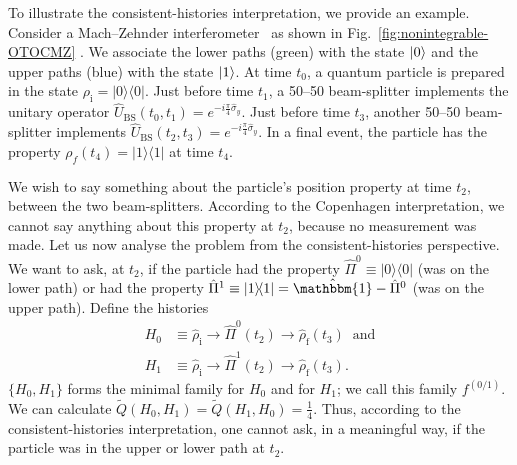 \documentclass[%
 reprint,
superscriptaddress,
nofootinbib,
bibnotes,
 amsmath,amssymb,
 aps,
]{revtex4-1}
\theoremstyle{plain}
\newcommand*{\ketbra}[2]{\lvert #1 \rangle\!\langle #2 \rvert}
\begin{document}
To illustrate the consistent-histories interpretation, we provide an example. Consider a Mach--Zehnder interferometer~\cite{Zehnder91, Mach92} as shown in Fig.~\ref{fig:nonintegrable-OTOCMZ} . We associate the lower paths (green) with the state $\ket{0}$ and the upper paths (blue) with the state $\ket{1}$.  At time $t_0$, a quantum particle is prepared in the state  $\rho_{\mathrm{i}} = \ketbra{0}{0}$. Just before time $t_1$, a 50--50  beam-splitter implements the unitary operator $\hat{U}_{\mathrm{BS}}(t_0, t_1) =e^{ - i \frac{\pi}{4} \hat{\sigma}_y  }$.   Just before time $t_3$, another 50--50  beam-splitter implements $\hat{U}_{\mathrm{BS}}(t_2, t_3)=e^{ - i \frac{\pi}{4} \hat{\sigma}_y  } $.  
In a final event, the particle has
the property  $\rho_f(t_4) = \ketbra{1}{1}$ at time $t_4$.  

We wish to say something about the particle's position property at time $t_2$, between the two beam-splitters.  According to the Copenhagen interpretation, we cannot say anything about this
property at $t_2$, because no measurement was made.  
Let us now analyse the problem from the consistent-histories perspective.  
We want to ask, at $t_2$, if the particle had the property $\hat{\Pi}^0 \equiv \ketbra{0}{0}$ (was on the lower path) or had the property $\hat{\Pi}^1 \equiv \ketbra{1}{1} = \hat{\mathbbm{1}} -\hat{\Pi}^0 $ (was on the upper path). Define the histories
\begin{align}
H_0 &
\equiv
\hat{\rho}_{\mathrm{i}} \rightarrow  \hat{\Pi}^0 (t_2)  \rightarrow \hat{\rho}_{\mathrm{f}} (t_3)  \; \; \mathrm{and} \\
H_1 &
\equiv
\hat{\rho}_{\mathrm{i}} \rightarrow  \hat{\Pi}^1 (t_2)  \rightarrow \hat{\rho}_{\mathrm{f}} (t_3) .
\end{align}
$\{ H_0, H_1 \}$ forms the minimal family for $H_0$ and for $H_1$; we call this family $f^{(0/1)}$.
We can calculate $\tilde{Q}(H_0,H_1)=\tilde{Q}(H_1,H_0)=\frac{1}{4}$. Thus, according to the consistent-histories interpretation, one cannot ask, in a meaningful way, if the particle was in the upper or lower path at $t_2$. 
\end{document}
